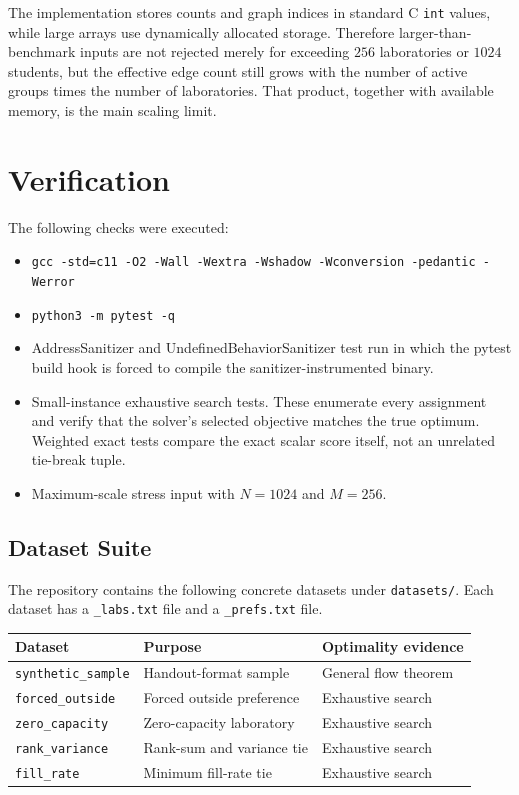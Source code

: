 \documentclass[11pt,a4paper]{article}
\begin{document}
The implementation stores counts and graph indices in standard C \texttt{int}
values, while large arrays use dynamically allocated storage.  Therefore
larger-than-benchmark inputs are not rejected merely for exceeding
\(256\) laboratories or \(1024\) students, but the effective edge count still
grows with the number of active groups times the number of laboratories.
That product, together with available memory, is the main scaling limit.

\section{Verification}

The following checks were executed:
\begin{itemize}[leftmargin=2em]
  \item \texttt{gcc -std=c11 -O2 -Wall -Wextra -Wshadow -Wconversion -pedantic -Werror}
  \item \texttt{python3 -m pytest -q}
  \item AddressSanitizer and UndefinedBehaviorSanitizer test run in which the
        pytest build hook is forced to compile the sanitizer-instrumented
        binary.
  \item Small-instance exhaustive search tests.  These enumerate every
        assignment and verify that the solver's selected objective matches the
        true optimum.  Weighted exact tests compare the exact scalar score
        itself, not an unrelated tie-break tuple.
  \item Maximum-scale stress input with \(N=1024\) and \(M=256\).
\end{itemize}

\subsection{Dataset Suite}

The repository contains the following concrete datasets under
\texttt{datasets/}.  Each dataset has a \texttt{\_labs.txt} file and a
\texttt{\_prefs.txt} file.

\begin{center}
\begin{tabular}{lll}
\toprule
Dataset & Purpose & Optimality evidence \\
\midrule
\texttt{synthetic\_sample} & Handout-format sample & General flow theorem \\
\texttt{forced\_outside} & Forced outside preference & Exhaustive search \\
\texttt{zero\_capacity} & Zero-capacity laboratory & Exhaustive search \\
\texttt{rank\_variance} & Rank-sum and variance tie & Exhaustive search \\
\texttt{fill\_rate} & Minimum fill-rate tie & Exhaustive search \\
\bottomrule
\end{tabular}
\end{center}
\end{document}
